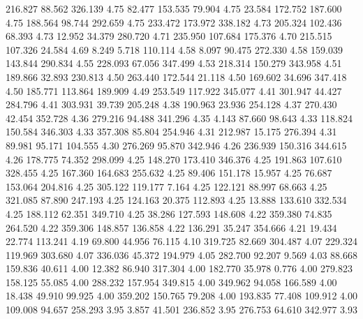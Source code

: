  216.827   88.562  326.139         4.75
  82.477  153.535   79.904         4.75
  23.584  172.752  187.600         4.75
 188.564   98.744  292.659         4.75
 233.472  173.972  338.182         4.73
 205.324  102.436   68.393         4.73
  12.952   34.379  280.720         4.71
 235.950  107.684  175.376         4.70
 215.515  107.326   24.584         4.69
   8.249    5.718  110.114         4.58
   8.097   90.475  272.330         4.58
 159.039  143.844  290.834         4.55
 228.093   67.056  347.499         4.53
 218.314  150.279  343.958         4.51
 189.866   32.893  230.813         4.50
 263.440  172.544   21.118         4.50
 169.602   34.696  347.418         4.50
 185.771  113.864  189.909         4.49
 253.549  117.922  345.077         4.41
 301.947   44.427  284.796         4.41
 303.931   39.739  205.248         4.38
 190.963   23.936  254.128         4.37
 270.430   42.454  352.728         4.36
 279.216   94.488  341.296         4.35
   4.143   87.660   98.643         4.33
 118.824  150.584  346.303         4.33
 357.308   85.804  254.946         4.31
 212.987   15.175  276.394         4.31
  89.981   95.171  104.555         4.30
 276.269   95.870  342.946         4.26
 236.939  150.316  344.615         4.26
 178.775   74.352  298.099         4.25
 148.270  173.410  346.376         4.25
 191.863  107.610  328.455         4.25
 167.360  164.683  255.632         4.25
  89.406  151.178   15.957         4.25
  76.687  153.064  204.816         4.25
 305.122  119.177    7.164         4.25
 122.121   88.997   68.663         4.25
 321.085   87.890  247.193         4.25
 124.163   20.375  112.893         4.25
  13.888  133.610  332.534         4.25
 188.112   62.351  349.710         4.25
  38.286  127.593  148.608         4.22
 359.380   74.835  264.520         4.22
 359.306  148.857  136.858         4.22
 136.291   35.247  354.666         4.21
  19.434   22.774  113.241         4.19
  69.800   44.956   76.115         4.10
 319.725   82.669  304.487         4.07
 229.324  119.969  303.680         4.07
 336.036   45.372  194.979         4.05
 282.700   92.207    9.569         4.03
  88.668  159.836   40.611         4.00
  12.382   86.940  317.304         4.00
 182.770   35.978    0.776         4.00
 279.823  158.125   55.085         4.00
 288.232  157.954  349.815         4.00
 349.962   94.058  166.589         4.00
  18.438   49.910   99.925         4.00
 359.202  150.765   79.208         4.00
 193.835   77.408  109.912         4.00
 109.008   94.657  258.293         3.95
   3.857   41.501  236.852         3.95
 276.753   64.610  342.977         3.93
